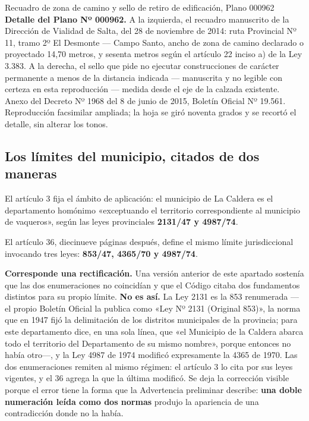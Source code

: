 %
{Recuadro de zona de camino y sello de retiro de edificación, Plano 000962}%
{\textbf{Detalle del Plano Nº 000962.} A la izquierda, el recuadro manuscrito de la
Dirección de Vialidad de Salta, del 28 de noviembre de 2014: ruta Provincial Nº 11, tramo 2º
El Desmonte --- Campo Santo, ancho de zona de camino declarado o proyectado 14,70 metros, y
sesenta metros según el artículo 22 inciso a) de la Ley 3.383. A la derecha, el sello que
pide no ejecutar construcciones de carácter permanente a menos de la distancia indicada
--- manuscrita y no legible con certeza en esta reproducción --- medida desde el eje de la
calzada existente.}%
{Anexo del Decreto Nº 1968 del 8 de junio de 2015, Boletín Oficial Nº 19.561. Reproducción
facsimilar ampliada; la hoja se giró noventa grados y se recortó el detalle, sin alterar los
tonos.}

\subsection*{Los límites del municipio, citados de dos maneras}

El artículo 3 fija el ámbito de aplicación: el municipio de La Caldera es el departamento homónimo «exceptuando el territorio correspondiente al municipio de vaqueros», según las leyes provinciales \textbf{2131/47 y 4987/74}.

El artículo 36, diecinueve páginas después, define el mismo límite jurisdiccional invocando tres leyes: \textbf{853/47, 4365/70 y 4987/74}.

\begin{cautela}
\textbf{Corresponde una rectificación.} Una versión anterior de este apartado sostenía que las dos enumeraciones no coincidían y que el Código citaba dos fundamentos distintos para su propio límite. \textbf{No es así.} La Ley 2131 es la 853 renumerada ---el propio Boletín Oficial la publica como «Ley Nº 2131 (Original 853)», la norma que en 1947 fijó la delimitación de los distritos municipales de la provincia; para este departamento dice, en una sola línea, que «el Municipio de la Caldera abarca todo el territorio del Departamento de su mismo nombre», porque entonces no había otro---, y la Ley 4987 de 1974 modificó expresamente la 4365 de 1970. Las dos enumeraciones remiten al mismo régimen: el artículo 3 lo cita por sus leyes vigentes, y el 36 agrega la que la última modificó. Se deja la corrección visible porque el error tiene la forma que la Advertencia preliminar describe: \textbf{una doble numeración leída como dos normas} produjo la apariencia de una contradicción donde no la había.
\end{cautela}

